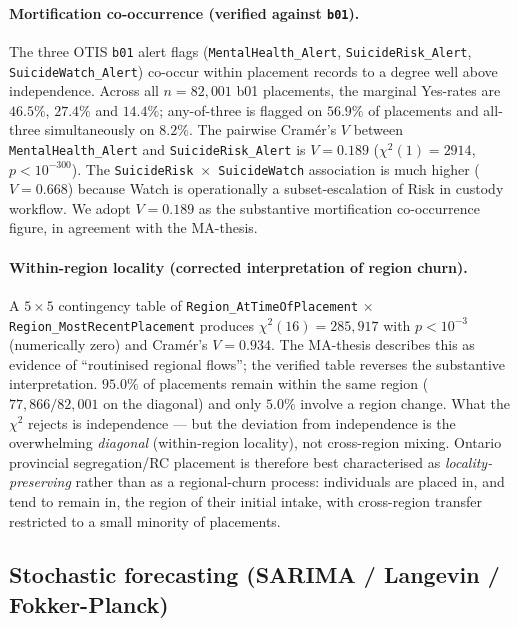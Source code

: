 \documentclass[article,shortnames,nojss]{jss}
\newcommand{\OTIS}{\textsf{OTIS}}
\begin{document}
\paragraph{Mortification co-occurrence (verified against \texttt{b01}).}
The three \OTIS{} \texttt{b01} alert flags
(\texttt{MentalHealth\_Alert}, \texttt{SuicideRisk\_Alert},
\texttt{SuicideWatch\_Alert}) co-occur within placement records to a
degree well above independence.  Across all $n=82{,}001$ b01
placements, the marginal Yes-rates are $46.5\%$, $27.4\%$ and
$14.4\%$; any-of-three is flagged on $56.9\%$ of placements and
all-three simultaneously on $8.2\%$.  The pairwise Cramér's $V$
between \texttt{MentalHealth\_Alert} and
\texttt{SuicideRisk\_Alert} is $V=0.189$
($\chi^2(1)=2914$, $p<10^{-300}$).  The
\texttt{SuicideRisk}~$\times$~\texttt{SuicideWatch} association is
much higher ($V=0.668$) because Watch is operationally a
subset-escalation of Risk in custody workflow.  We adopt
$V=0.189$ as the substantive mortification co-occurrence figure,
in agreement with the MA-thesis.

\paragraph{Within-region locality (corrected interpretation of region churn).}
A $5\times5$ contingency table of
\texttt{Region\_AtTimeOfPlacement} $\times$
\texttt{Region\_MostRecentPlacement} produces
$\chi^2(16)=285{,}917$ with $p<10^{-3}$ (numerically zero) and
Cramér's $V=0.934$.  The MA-thesis describes this as evidence of
``routinised regional flows''; the verified table reverses the
substantive interpretation.  $95.0\%$ of placements remain within
the same region ($77{,}866/82{,}001$ on the diagonal) and only
$5.0\%$ involve a region change.  What the $\chi^2$ rejects is
independence — but the deviation from independence is the
overwhelming \emph{diagonal} (within-region locality), not
cross-region mixing.  Ontario provincial segregation/RC
placement is therefore best characterised as
\emph{locality-preserving} rather than as a regional-churn
process: individuals are placed in, and tend to remain in, the
region of their initial intake, with cross-region transfer
restricted to a small minority of placements.

\subsection{Stochastic forecasting (SARIMA / Langevin / Fokker-Planck)}\label{phys-forecasting}
\end{document}

